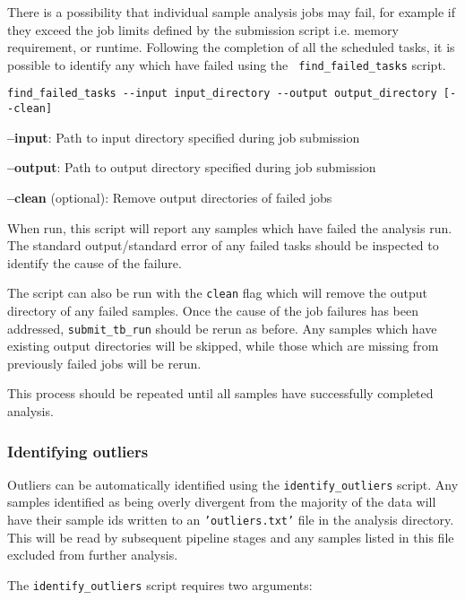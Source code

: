 \documentclass[a4paper,10pt,twoside]{article}
\newenvironment{tight_itemize}{
\begin{itemize}
  \setlength{\itemsep}{0pt}
  \setlength{\parskip}{0pt}
}{\end{itemize}}
\begin{document}
There is a possibility that individual sample analysis jobs may fail, for
example if they exceed the job limits defined by the submission script i.e.
memory requirement, or runtime. Following the completion of all the scheduled
tasks, it is possible to identify any which have failed using the {\tt
find\_failed\_tasks} script.

\begin{verbatim}
find_failed_tasks --input input_directory --output output_directory [--clean]
\end{verbatim}

\begin{tight_itemize}
\item \textbf{--input}: Path to input directory specified during job submission
\item \textbf{--output}: Path to output directory specified during job submission
\item \textbf{--clean} (optional): Remove output directories of failed jobs
\end{tight_itemize}

When run, this script will report any samples which have failed the analysis
run. The standard output/standard error of any failed tasks should be inspected
to identify the cause of the failure. 

The script can also be run with the {\tt clean} flag which will remove the
output directory of any failed samples. Once the cause of the job failures has
been addressed, {\tt submit\_tb\_run} should be rerun as before. Any samples which
have existing output directories will be skipped, while those which are missing
from previously failed jobs will be rerun. 

This process should be repeated until all samples have successfully completed analysis.

\subsubsection{Identifying outliers}

Outliers can be automatically identified using the {\tt identify\_outliers}
script. Any samples identified as being overly divergent from the majority of
the data will have their sample ids written to an {\tt 'outliers.txt'} file in
the analysis directory. This will be read by subsequent pipeline stages and any
samples listed in this file excluded from further analysis.

The {\tt identify\_outliers} script requires two arguments:
\end{document}
